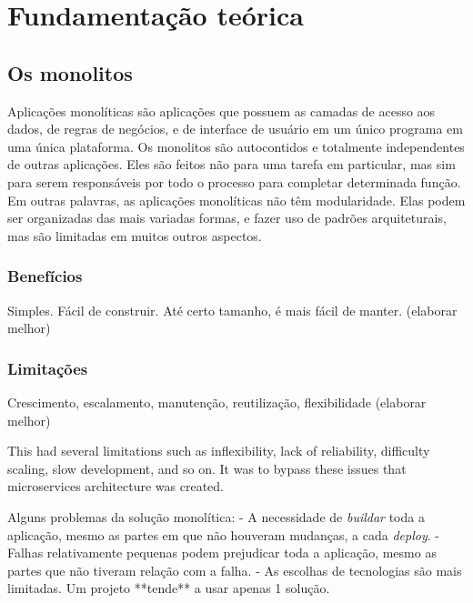 \chapter{Fundamentação teórica}\label{cap_exemplos}


\section{Os monolitos}

Aplicações monolíticas são aplicações que possuem as camadas de acesso aos dados, de regras de negócios, e de interface de usuário em um único programa em uma única plataforma. Os monolitos são autocontidos e totalmente independentes de outras aplicações. Eles são feitos não para uma tarefa em particular, mas sim para serem responsáveis por todo o processo para completar determinada função. Em outras palavras, as aplicações monolíticas não têm modularidade. Elas podem ser organizadas das mais variadas formas, e fazer uso de padrões arquiteturais, mas são limitadas em muitos outros aspectos.

\subsection{Benefícios}

Simples. Fácil de construir. Até certo tamanho, é mais fácil de manter. (elaborar melhor)

\subsection{Limitações}

Crescimento, escalamento, manutenção, reutilização, flexibilidade (elaborar melhor)

This had several limitations such as inflexibility, lack of reliability, difficulty scaling, slow development, and so on. It was to bypass these issues that microservices architecture was created.

Alguns problemas da solução monolítica:
- A necessidade de \emph{buildar} toda a aplicação, mesmo as partes em que não houveram mudanças, a cada \emph{deploy}.
- Falhas relativamente pequenas podem prejudicar toda a aplicação, mesmo as partes que não tiveram relação com a falha.
- As escolhas de tecnologias são mais limitadas. Um projeto **tende** a usar apenas 1 solução.

